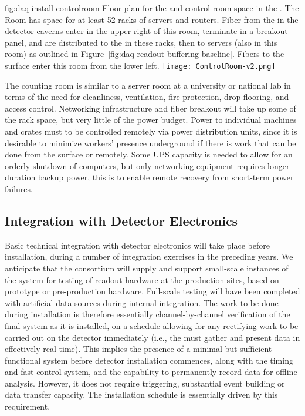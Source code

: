 \begin{dunefigure}{fig:daq-install-controlroom}
  {Floor plan for the  and control room space in the .  The 
    Room has space for at least \num{52} racks of servers and routers.
    Fiber from the  in the detector caverns enter in the upper
    right of this room, terminate in a breakout panel, and are
    distributed to the  in these racks, then to  servers (also
    in this room) as outlined in
    Figure~\ref{fig:daq-readout-buffering-baseline}.  Fibers to the
    surface enter this room from the lower left.}
\texttt{[image: ControlRoom-v2.png]}
\end{dunefigure}

The counting room is similar to a server room at a university or national lab in terms of the need for cleanliness, ventilation, fire protection, drop flooring, and access control. Networking infrastructure and fiber breakout will take up some of the rack space, but %
very little of the power budget. Power to individual machines and crates must to be controlled remotely via power distribution units, since it is desirable to minimize  workers' presence underground if there is work that can be done from the surface or remotely.  Some UPS capacity is needed to allow for an orderly shutdown of computers, but only networking equipment requires longer-duration backup power, this is to enable remote recovery from short-term power failures.  

\subsection{Integration with Detector Electronics}
\label{sec:fdsp-daq-install-transport}

Basic technical integration with detector electronics will take place before installation, during a number of integration exercises in the preceding years. We anticipate that the consortium will supply and support small-scale instances of the  system for testing of readout hardware at the production sites, based on prototype or pre-production hardware. Full-scale  testing will have been completed with artificial data sources during internal integration. The work to be done during installation is therefore essentially channel-by-channel verification of the final system as it is installed, on a schedule allowing for any rectifying work to be carried out on the detector immediately (i.e., the  must gather and present data in effectively real time). This implies the presence of a minimal but sufficient functional  system before detector installation commences, along with the timing and fast control system, and the capability to permanently record data for offline analysis. However, it does not require triggering, substantial event building or data transfer capacity. The  installation schedule is essentially driven by this requirement.

